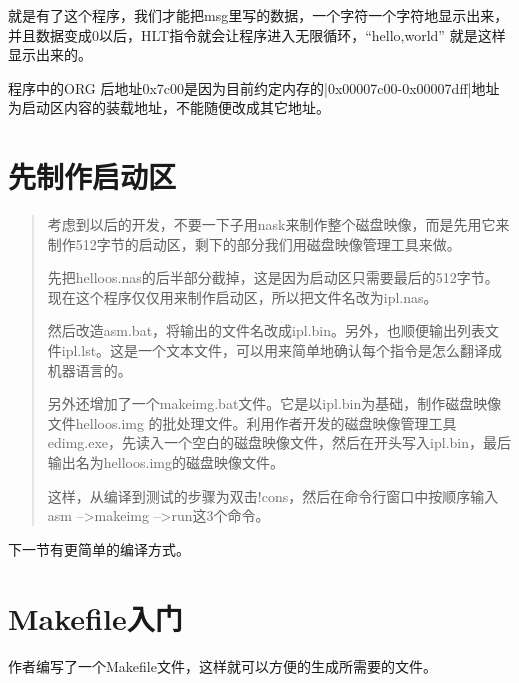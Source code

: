 就是有了这个程序，我们才能把msg里写的数据，一个字符一个字符地显示出来，并且数据变成0以后，HLT指令就会让程序进入无限循环，“hello,world” 就是这样显示出来的。

\cs

程序中的ORG 后地址0x7c00是因为目前约定内存的|0x00007c00-0x00007dff|地址为启动区内容的装载地址，不能随便改成其它地址。

\section{	先制作启动区	}

\begin{quote}
考虑到以后的开发，不要一下子用nask来制作整个磁盘映像，而是先用它来制作512字节的启动区，剩下的部分我们用磁盘映像管理工具来做。

先把helloos.nas的后半部分截掉，这是因为启动区只需要最后的512字节。现在这个程序仅仅用来制作启动区，所以把文件名改为ipl.nas。

然后改造asm.bat，将输出的文件名改成ipl.bin。另外，也顺便输出列表文件ipl.lst。这是一个文本文件，可以用来简单地确认每个指令是怎么翻译成机器语言的。

另外还增加了一个makeimg.bat文件。它是以ipl.bin为基础，制作磁盘映像文件helloos.img 的批处理文件。利用作者开发的磁盘映像管理工具edimg.exe，先读入一个空白的磁盘映像文件，然后在开头写入ipl.bin，最后输出名为helloos.img的磁盘映像文件。

这样，从编译到测试的步骤为双击!cons，然后在命令行窗口中按顺序输入asm -->makeimg -->run这3个命令。
\end{quote}

下一节有更简单的编译方式。


\section{	Makefile入门	}

作者编写了一个Makefile文件，这样就可以方便的生成所需要的文件。

